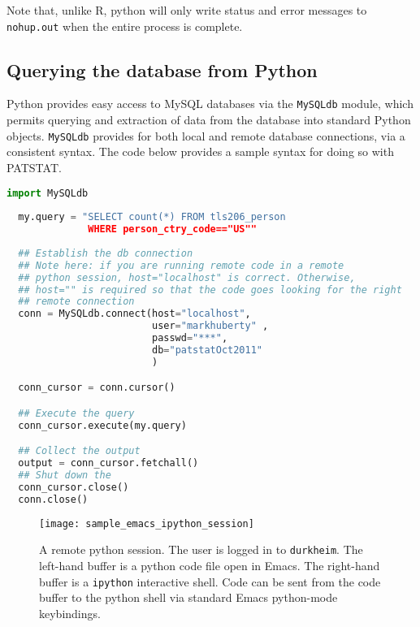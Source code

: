 \documentclass[11pt]{article}
\begin{document}
Note that, unlike R, python will only write status and error messages
to \texttt{nohup.out} when the entire process is complete. 

\subsection{Querying the database from Python}
\label{sec:query-datab-from}

Python provides easy access to MySQL databases via the
\texttt{MySQLdb} module, which permits querying and extraction of data
from the database into standard Python objects. \texttt{MySQLdb}
provides for both local and remote database connections, via a
consistent syntax. The code below
provides a sample syntax for doing so with PATSTAT.

\begin{lstlisting}[language=python, numbers=none, frame=single]
  import MySQLdb
  
  my.query = "SELECT count(*) FROM tls206_person 
              WHERE person_ctry_code=="US""
  
  ## Establish the db connection
  ## Note here: if you are running remote code in a remote
  ## python session, host="localhost" is correct. Otherwise,
  ## host="" is required so that the code goes looking for the right
  ## remote connection
  conn = MySQLdb.connect(host="localhost",
                         user="markhuberty" ,
                         passwd="***",
                         db="patstatOct2011"
                         )

  conn_cursor = conn.cursor()

  ## Execute the query
  conn_cursor.execute(my.query)

  ## Collect the output
  output = conn_cursor.fetchall()
  ## Shut down the 
  conn_cursor.close()
  conn.close()
\end{lstlisting}


\begin{landscape}
  \begin{figure}[ht]
    \centering
    \texttt{[image: sample\_emacs\_ipython\_session]}
    \caption{A remote python session. The user is logged in to
      \texttt{durkheim}. The left-hand buffer is a python code file
      open in Emacs. The right-hand buffer is a \texttt{ipython}
      interactive shell. Code can be sent from the code buffer to the
      python shell via standard Emacs python-mode keybindings. }
    \label{fig:sample-emacs-ipython-remote}
  \end{figure}
\end{landscape}
\end{document}

